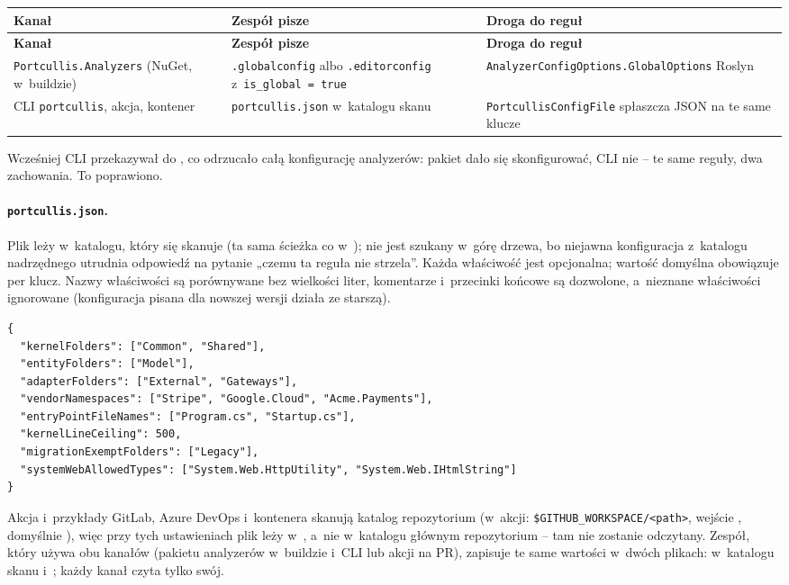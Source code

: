 \begin{xltabular}{\linewidth}{@{}>{\raggedright\arraybackslash}p{4.4cm} >{\raggedright\arraybackslash}p{4.4cm} >{\raggedright\arraybackslash}X@{}}
\toprule
\textbf{Kanał} & \textbf{Zespół pisze} & \textbf{Droga do reguł} \\
\midrule
\endfirsthead
\toprule
\textbf{Kanał} & \textbf{Zespół pisze} & \textbf{Droga do reguł} \\
\midrule
\endhead
\texttt{Portcullis.Analyzers} (NuGet, w~buildzie) & \texttt{.globalconfig} albo \texttt{.editorconfig} z~\texttt{is\_global = true} & \texttt{AnalyzerConfigOptions.GlobalOptions} Roslyn \\
CLI \texttt{portcullis}, akcja, kontener & \texttt{portcullis.json} w~katalogu skanu & \texttt{PortcullisConfigFile} spłaszcza JSON na te same klucze \\
\bottomrule
\end{xltabular}

Wcześniej CLI przekazywał  do ,
co odrzucało całą konfigurację analyzerów: pakiet dało się skonfigurować, CLI nie -- te
same reguły, dwa zachowania. To poprawiono.

\paragraph{\texttt{portcullis.json}.} Plik leży w~katalogu, który się skanuje (ta sama
ścieżka co w~); nie jest szukany w~górę drzewa, bo niejawna
konfiguracja z~katalogu nadrzędnego utrudnia odpowiedź na pytanie „czemu ta reguła nie
strzela”. Każda właściwość jest opcjonalna; wartość domyślna obowiązuje per klucz. Nazwy
właściwości są porównywane bez wielkości liter, komentarze i~przecinki końcowe są
dozwolone, a~nieznane właściwości ignorowane (konfiguracja pisana dla nowszej wersji działa
ze starszą).

\begin{lstlisting}
{
  "kernelFolders": ["Common", "Shared"],
  "entityFolders": ["Model"],
  "adapterFolders": ["External", "Gateways"],
  "vendorNamespaces": ["Stripe", "Google.Cloud", "Acme.Payments"],
  "entryPointFileNames": ["Program.cs", "Startup.cs"],
  "kernelLineCeiling": 500,
  "migrationExemptFolders": ["Legacy"],
  "systemWebAllowedTypes": ["System.Web.HttpUtility", "System.Web.IHtmlString"]
}
\end{lstlisting}

Akcja i~przykłady GitLab, Azure DevOps i~kontenera skanują katalog 
repozytorium (w~akcji: \texttt{\$GITHUB\_WORKSPACE/<path>}, wejście ,
domyślnie ), więc przy tych ustawieniach plik leży w~,
a~nie w~katalogu głównym repozytorium -- tam nie zostanie odczytany. Zespół, który używa obu
kanałów (pakietu analyzerów w~buildzie i~CLI lub akcji na PR), zapisuje te same wartości
w~dwóch plikach:  w~katalogu skanu i~;
każdy kanał czyta tylko swój.

